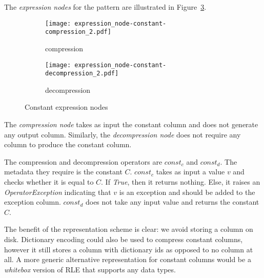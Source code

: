 The \textit{expression nodes} for the  pattern are illustrated in Figure~\ref{fig:pd:constant:exprnode}.

\begin{figure}[h]
  \centering
  \begin{subfigure}[t]{0.4\linewidth}
    \centering
    \texttt{[image: expression\_node-constant-compression\_2.pdf]}
    \caption[b]{compression}
    \label{fig:pd:constant:exprnode:compression}
  \end{subfigure}
  \hspace{1em}
  \begin{subfigure}[t]{0.4\linewidth}
    \centering
    \texttt{[image: expression\_node-constant-decompression\_2.pdf]}
    \caption[b]{decompression}
    \label{fig:pd:constant:exprnode:decompression}
  \end{subfigure}
  \caption{Constant expression nodes}
  \label{fig:pd:constant:exprnode}
\end{figure}

The \textit{compression node} takes as input the constant column and does not generate any output column. Similarly, the \textit{decompression node} does not require any column to produce the constant column.

The compression and decompression operators are \(const_{c}\) and \(const_{d}\). The metadata they require is the constant \(C\). \(const_{c}\) takes as input a value \(v\) and checks whether it is equal to \(C\). If \textit{True}, then it returns nothing. Else, it raises an \textit{OperatorException} indicating that \(v\) is an exception and should be added to the exception column. \(const_{d}\) does not take any input value and returns the constant \(C\).

The benefit of the  representation scheme is clear: we avoid storing a column on disk. Dictionary encoding could also be used to compress constant columns, however it still stores a column with dictionary ids as opposed to no column at all. A more generic alternative representation for constant columns would be a \textit{whitebox} version of RLE that supports any data types.

